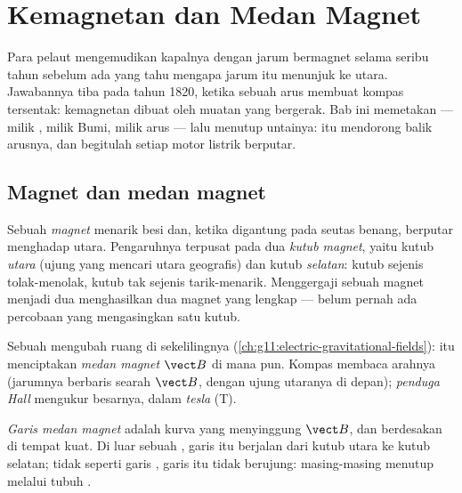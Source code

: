 \chapter{Kemagnetan dan Medan Magnet}\label{ch:g11:magnetic-fields}

Para pelaut mengemudikan kapalnya dengan jarum bermagnet selama seribu
tahun sebelum ada yang tahu mengapa jarum itu menunjuk ke utara.
Jawabannya tiba pada tahun 1820, ketika sebuah arus membuat kompas
tersentak: kemagnetan dibuat oleh muatan yang bergerak. Bab ini
memetakan  --- milik , milik Bumi, milik arus ---
lalu menutup untainya:  itu mendorong balik arusnya, dan begitulah
setiap motor listrik berputar.

\section{Magnet dan medan magnet}

\begin{definition}\label{def:g11:magnetic-fields:magnet}
Sebuah \emph{magnet} menarik besi dan, ketika digantung
pada seutas benang, berputar menghadap utara. Pengaruhnya terpusat pada
dua \emph{kutub magnet}, yaitu kutub \emph{utara}
(ujung yang mencari utara geografis) dan kutub \emph{selatan}: kutub
sejenis tolak-menolak, kutub tak sejenis tarik-menarik. Menggergaji
sebuah magnet menjadi dua menghasilkan dua magnet yang lengkap ---
belum pernah ada percobaan yang mengasingkan satu kutub.
\end{definition}

\begin{definition}\label{def:g11:magnetic-fields:bfield}
Sebuah  mengubah ruang di sekelilingnya
(\cref{ch:g11:electric-gravitational-fields}):  itu menciptakan
\emph{medan magnet} $\vect B$ di mana pun. Kompas
membaca arahnya (jarumnya berbaris searah $\vect B$, dengan ujung
utaranya di depan); \emph{penduga Hall} mengukur
besarnya, dalam \emph{tesla} (\unit{T}).
\end{definition}

\begin{definition}\label{def:g11:magnetic-fields:lines}
\emph{Garis medan magnet} adalah kurva yang
menyinggung $\vect B$, dan berdesakan di tempat  kuat. Di luar
sebuah , garis itu berjalan dari kutub utara ke kutub selatan;
tidak seperti garis , garis itu tidak berujung:
masing-masing menutup melalui tubuh .
\end{definition}

